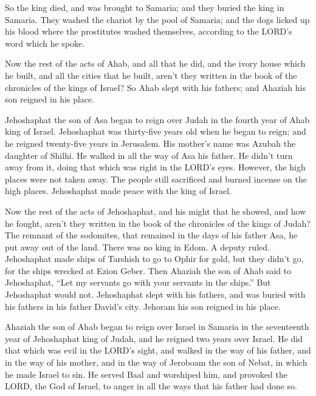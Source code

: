 \myverse{}So the king died, and was brought to Samaria; and they buried
the king in Samaria.
\myverse{}They washed the chariot by the pool of Samaria; and the dogs licked up his
blood where the prostitutes washed themselves, according to the LORD’s word which he spoke.

\myverse{}Now the rest of the acts of Ahab, and all that he did, and the
ivory house which he built, and all the cities that he built, aren’t they written in the book of the chronicles
of the kings of Israel?
\myverse{}So Ahab slept with his fathers; and Ahaziah his son reigned in his place.

\myverse{}Jehoshaphat the son of Asa began to reign over Judah in the
fourth year of Ahab king of Israel.
\myverse{}Jehoshaphat was thirty-five years old when he began to reign; and he reigned
twenty-five years in Jerusalem. His mother’s name was Azubah the daughter of Shilhi.
\myverse{}He walked in all the way of Asa his father. He didn’t turn away from it,
doing that which was right in the LORD’s eyes. However, the high places were not taken away. The people
still sacrificed and burned incense on the high places.
\myverse{}Jehoshaphat made peace with the king of Israel.

\myverse{}Now the rest of the acts of Jehoshaphat, and his might that
he showed, and how he fought, aren’t they written in the book of the chronicles of the kings of Judah?
\myverse{}The remnant of the sodomites, that remained in the days of his father Asa,
he put away out of the land.
\myverse{}There was no king in Edom. A deputy ruled.
\myverse{}Jehoshaphat made ships of Tarshish to go to Ophir for gold, but they didn’t
go, for the ships wrecked at Ezion Geber.
\myverse{}Then Ahaziah the son of Ahab said to Jehoshaphat, “Let my servants go with
your servants in the ships.” But Jehoshaphat would not.
\myverse{}Jehoshaphat slept with his fathers, and was buried with his fathers in his
father David’s city. Jehoram his son reigned in his place.

\myverse{}Ahaziah the son of Ahab began to reign over Israel in Samaria
in the seventeenth year of Jehoshaphat king of Judah, and he reigned two years over Israel.
\myverse{}He did that which was evil in the LORD’s sight, and walked in the way of
his father, and in the way of his mother, and in the way of Jeroboam the son of Nebat, in which he made
Israel to sin.
\myverse{}He served Baal and worshiped him, and provoked the LORD, the God of Israel,
to anger in all the ways that his father had done so.


